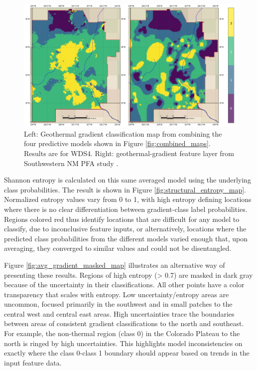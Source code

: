 \begin{figure}[!htp]
\centering
\includegraphics[width=\textwidth]{templates/images/Figure-Average_Gradient_Map_Joint.png}
\caption[Combined model prediction map]{Left: Geothermal gradient classification map from combining the four predictive models shown in Figure \ref{fig:combined_maps}. Results are for WDS4. Right: geothermal-gradient feature layer from Southwestern NM PFA study \protect\citep{bielicki_hydrogeolgic_2015}.}
\label{fig:avg_final_map}
\end{figure}

Shannon entropy is calculated on this same averaged model using the underlying class probabilities. The result is shown in Figure \ref{fig:structural_entropy_map}. Normalized entropy values vary from 0 to 1, with high entropy defining locations where there is no clear differentiation between gradient-class label probabilities. Regions colored red thus identify locations that are difficult for any model to classify, due to inconclusive feature inputs, or alternatively, locations where the predicted class probabilities from the different models varied enough that, upon averaging, they converged to similar values and could not be disentangled.

Figure \ref{fig:avg_gradient_masked_map} illustrates an alternative way of presenting these results. Regions of high entropy (> 0.7) are masked in dark gray because of the uncertainty in their classifications. All other points have a color transparency that scales with entropy. Low uncertainty/entropy areas are uncommon, focused primarily in the southwest and in small patches to the central west and central east areas. High uncertainties trace the boundaries between areas of consistent gradient classifications to the north and southeast. For example, the non-thermal region (class 0) in the Colorado Plateau to the north is ringed by high uncertainties. This highlights model inconsistencies on exactly where the class 0-class 1 boundary should appear based on trends in the input feature data.


